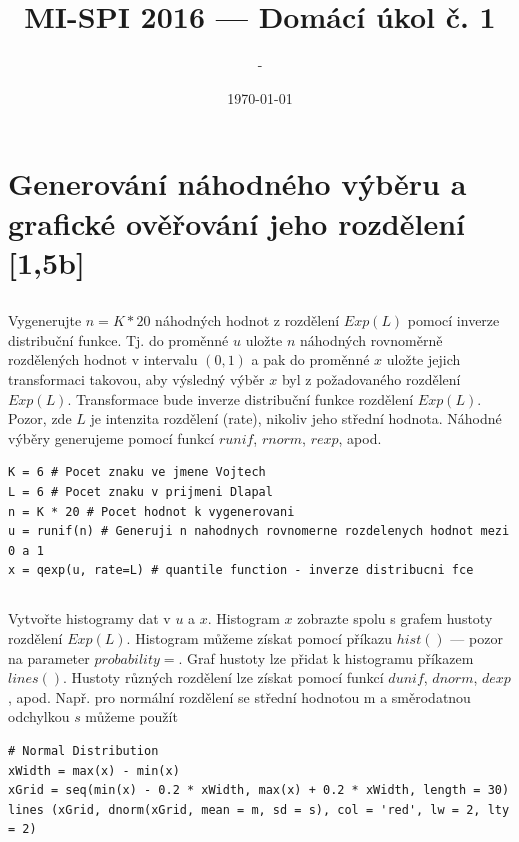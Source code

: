 \documentclass[a4paper]{article}
\begin{document}
\title{MI-SPI 2016 — Domácí úkol č. 1}
\author{-} %
\date{\today}
\maketitle


\section{Generování náhodného výběru a grafické ověřování jeho rozdělení [1,5b]}
\subsection{}
Vygenerujte $n = K*20$ náhodných hodnot z rozdělení $Exp(L)$ pomocí inverze distribuční funkce. Tj. do proměnné $u$ uložte $n$ náhodných rovnoměrně rozdělených hodnot v intervalu $(0,1)$ a pak do proměnné $x$ uložte jejich transformaci takovou, aby výsledný výběr $x$ byl z požadovaného rozdělení $Exp(L)$. Transformace bude inverze distribuční funkce rozdělení $Exp(L)$. Pozor, zde $L$ je intenzita rozdělení (rate), nikoliv jeho střední hodnota. Náhodné výběry generujeme pomocí funkcí $runif$, $rnorm$, $rexp$, apod.

\lstset{language = r, numbers=left, tabsize = 4, title=Řešení, basicstyle=\footnotesize}
\begin{lstlisting}[firstnumber=1]
K = 6 # Pocet znaku ve jmene Vojtech
L = 6 # Pocet znaku v prijmeni Dlapal
n = K * 20 # Pocet hodnot k vygenerovani
u = runif(n) # Generuji n nahodnych rovnomerne rozdelenych hodnot mezi 0 a 1
x = qexp(u, rate=L) # quantile function - inverze distribucni fce
\end{lstlisting}

\subsection{}
Vytvořte histogramy dat v $u$ a $x$. Histogram $x$ zobrazte spolu s grafem hustoty rozdělení $Exp(L)$. Histogram můžeme získat pomocí příkazu $hist()$ — pozor na parameter $probability=$. Graf hustoty lze přidat k histogramu příkazem $lines()$. Hustoty různých rozdělení lze získat pomocí funkcí $dunif$, $dnorm$, $dexp$, apod. Např. pro normální rozdělení se střední hodnotou m a směrodatnou odchylkou $s$ můžeme použít

\lstset{title=Tip}
\begin{lstlisting}
# Normal Distribution
xWidth = max(x) - min(x)
xGrid = seq(min(x) - 0.2 * xWidth, max(x) + 0.2 * xWidth, length = 30)
lines (xGrid, dnorm(xGrid, mean = m, sd = s), col = 'red', lw = 2, lty = 2)
\end{lstlisting}
\end{document}
